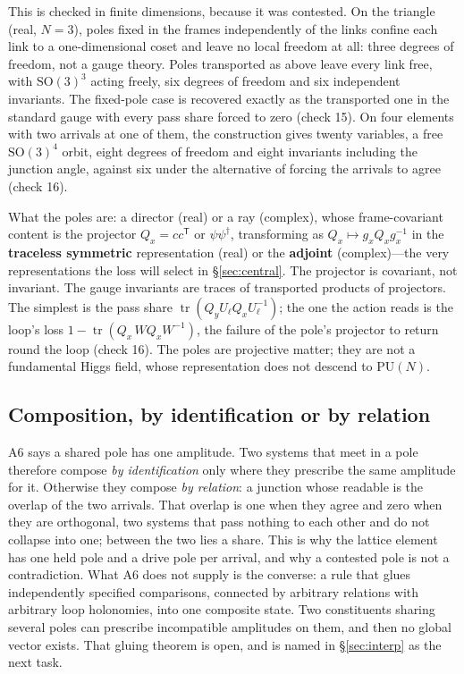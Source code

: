 \documentclass[11pt,a4paper]{article}
\theoremstyle{plain}
\theoremstyle{definition}
\theoremstyle{remark}
\newcommand{\tr}{\operatorname{tr}}
\newcommand{\SO}{\mathrm{SO}}
\newcommand{\PU}{\mathrm{PU}}
\begin{document}
This is checked in finite dimensions, because it was contested. On the triangle (real, $N=3$), poles fixed in the frames independently of the links confine each link to a one-dimensional coset and leave no local freedom at all: three degrees of freedom, not a gauge theory. Poles transported as above leave every link free, with $\SO(3)^3$ acting freely, six degrees of freedom and six independent invariants. The fixed-pole case is recovered exactly as the transported one in the standard gauge with every pass share forced to zero (check 15). On four elements with two arrivals at one of them, the construction gives twenty variables, a free $\SO(3)^4$ orbit, eight degrees of freedom and eight invariants including the junction angle, against six under the alternative of forcing the arrivals to agree (check 16).

What the poles are: a director (real) or a ray (complex), whose frame-covariant content is the projector $Q_x=cc^{\mathsf T}$ or $\psi\psi^\dagger$, transforming as $Q_x\mapsto g_xQ_xg_x^{-1}$ in the \textbf{traceless symmetric} representation (real) or the \textbf{adjoint} (complex)---the very representations the loss will select in \S\ref{sec:central}. The projector is covariant, not invariant. The gauge invariants are traces of transported products of projectors. The simplest is the pass share $\tr(Q_yU_\ell Q_xU_\ell^{-1})$; the one the action reads is the loop's loss $1-\tr(Q_x\,WQ_xW^{-1})$, the failure of the pole's projector to return round the loop (check 16). The poles are projective matter; they are not a fundamental Higgs field, whose representation does not descend to $\PU(N)$.

\subsection{Composition, by identification or by relation}

A6 says a shared pole has one amplitude. Two systems that meet in a pole therefore compose \emph{by identification} only where they prescribe the same amplitude for it. Otherwise they compose \emph{by relation}: a junction whose readable is the overlap of the two arrivals. That overlap is one when they agree and zero when they are orthogonal, two systems that pass nothing to each other and do not collapse into one; between the two lies a share. This is why the lattice element has one held pole and a drive pole per arrival, and why a contested pole is not a contradiction. What A6 does not supply is the converse: a rule that glues independently specified comparisons, connected by arbitrary relations with arbitrary loop holonomies, into one composite state. Two constituents sharing several poles can prescribe incompatible amplitudes on them, and then no global vector exists. That gluing theorem is open, and is named in \S\ref{sec:interp} as the next task.
\end{document}
